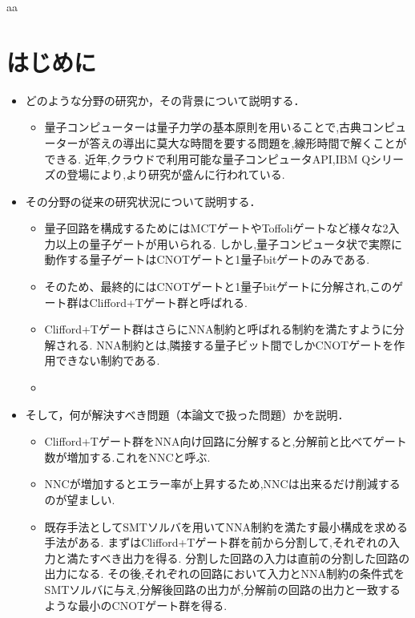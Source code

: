 \documentclass[10pt]{jbook}
\begin{document}
\maketitle
\tableofcontents
aa
\chapter{はじめに}

\begin{itemize}
  \item どのような分野の研究か，その背景について説明する．
     \begin{itemize}
       \item 量子コンピューターは量子力学の基本原則を用いることで,古典コンピューターが答えの導出に莫大な時間を要する問題を,線形時間で解くことができる.
       近年,クラウドで利用可能な量子コンピュータAPI,IBM Qシリーズの登場により,より研究が盛んに行われている. 
     \end{itemize}
  \item その分野の従来の研究状況について説明する．
     \begin{itemize}
      \item 量子回路を構成するためにはMCTゲートやToffoliゲートなど様々な2入力以上の量子ゲートが用いられる.
      しかし,量子コンピュータ状で実際に動作する量子ゲートはCNOTゲートと1量子bitゲートのみである.
      \item そのため、最終的にはCNOTゲートと1量子bitゲートに分解され,このゲート群はClifford+Tゲート群と呼ばれる.
      \item Clifford+Tゲート群はさらにNNA制約と呼ばれる制約を満たすように分解される.
      NNA制約とは,隣接する量子ビット間でしかCNOTゲートを作用できない制約である.
      \item 
    \end{itemize}
  \item そして，何が解決すべき問題（本論文で扱った問題）かを説明．
    \begin{itemize}
      \item Clifford+Tゲート群をNNA向け回路に分解すると,分解前と比べてゲート数が増加する.これをNNCと呼ぶ.
      \item NNCが増加するとエラー率が上昇するため,NNCは出来るだけ削減するのが望ましい.
      \item 既存手法としてSMTソルバを用いてNNA制約を満たす最小構成を求める手法がある.
      まずはClifford+Tゲート群を前から分割して,それぞれの入力と満たすべき出力を得る.
      分割した回路の入力は直前の分割した回路の出力になる.
      その後,それぞれの回路において入力とNNA制約の条件式をSMTソルバに与え,分解後回路の出力が,分解前の回路の出力と一致するような最小のCNOTゲート群を得る.

\end{itemize}
\end{itemize}
\end{document}
